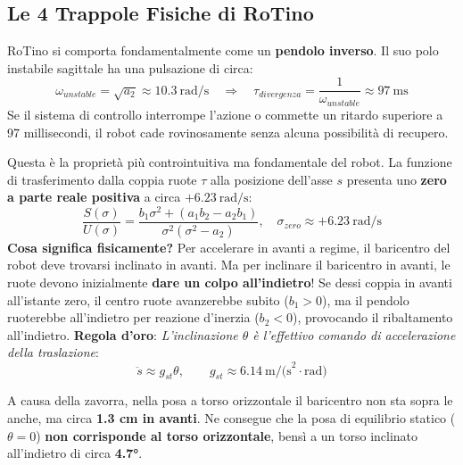 \documentclass[11pt,a4paper]{article}
\begin{document}
\subsection{Le 4 Trappole Fisiche di RoTino}

\begin{tcolorbox}[title=Trappola 1: Instabilità Naturale ad Alta Frequenza]
RoTino si comporta fondamentalmente come un \textbf{pendolo inverso}. Il suo polo instabile sagittale ha una pulsazione di circa:
\begin{equation}
\omega_{unstable} = \sqrt{a_2} \approx 10.3\ \text{rad/s} \quad \Longrightarrow \quad \tau_{divergenza} = \frac{1}{\omega_{unstable}} \approx 97\ \text{ms}
\end{equation}
Se il sistema di controllo interrompe l'azione o commette un ritardo superiore a 97 millisecondi, il robot cade rovinosamente senza alcuna possibilità di recupero.
\end{tcolorbox}

\begin{tcolorbox}[title=Trappola 2: Il Sistema è a Fase Non Minima (Zero a Parte Reale Positiva)]
Questa è la proprietà più controintuitiva ma fondamentale del robot. La funzione di trasferimento dalla coppia ruote $\tau$ alla posizione dell'asse $s$ presenta uno \textbf{zero a parte reale positiva} a circa $+6.23\ \text{rad/s}$:
\begin{equation}
\frac{S(\sigma)}{U(\sigma)} = \frac{b_1\sigma^2 + (a_1b_2 - a_2b_1)}{\sigma^2(\sigma^2 - a_2)}, \quad \sigma_{zero} \approx +6.23\ \text{rad/s}
\end{equation}
\textbf{Cosa significa fisicamente?} Per accelerare in avanti a regime, il baricentro del robot deve trovarsi inclinato in avanti. Ma per inclinare il baricentro in avanti, le ruote devono inizialmente \textbf{dare un colpo all'indietro}! Se dessi coppia in avanti all'istante zero, il centro ruote avanzerebbe subito ($b_1 > 0$), ma il pendolo ruoterebbe all'indietro per reazione d'inerzia ($b_2 < 0$), provocando il ribaltamento all'indietro. 
\textbf{Regola d'oro}: \textit{L'inclinazione $\theta$ è l'effettivo comando di accelerazione della traslazione}:
\begin{equation}
\ddot{s} \approx g_{st} \theta, \qquad g_{st} \approx 6.14\ \text{m/(s}^2\cdot\text{rad)}
\end{equation}
\end{tcolorbox}

\begin{tcolorbox}[title=Trappola 3: Il Baricentro del Torso è Spostato in Avanti]
A causa della zavorra, nella posa a torso orizzontale il baricentro non sta sopra le anche, ma circa \textbf{1.3 cm in avanti}. Ne consegue che la posa di equilibrio statico ($\theta = 0$) \textbf{non corrisponde al torso orizzontale}, bensì a un torso inclinato all'indietro di circa \textbf{4.7°}.
\end{tcolorbox}
\end{document}
